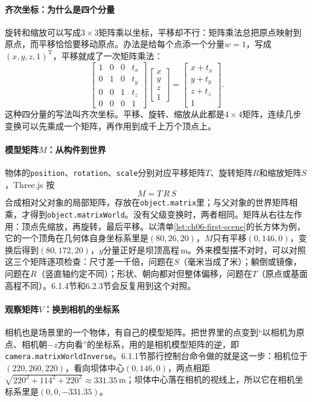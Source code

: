 \paragraph{齐次坐标：为什么是四个分量}旋转和缩放可以写成$3\times3$矩阵乘以坐标，平移却不行：矩阵乘法总把原点映射到原点，而平移恰恰要移动原点。办法是给每个点添一个分量$w=1$，写成$(x,y,z,1)^{\mathrm T}$，平移就成了一次矩阵乘法：
\[
\begin{bmatrix}1&0&0&t_x\\0&1&0&t_y\\0&0&1&t_z\\0&0&0&1\end{bmatrix}
\begin{bmatrix}x\\y\\z\\1\end{bmatrix}
=\begin{bmatrix}x+t_x\\y+t_y\\z+t_z\\1\end{bmatrix}.
\]
这种四分量的写法叫齐次坐标。平移、旋转、缩放从此都是$4\times4$矩阵，连续几步变换可以先乘成一个矩阵，再作用到成千上万个顶点上。

\paragraph{模型矩阵$M$：从构件到世界}物体的\texttt{position}、\texttt{rotation}、\texttt{scale}分别对应平移矩阵$T$、旋转矩阵$R$和缩放矩阵$S$，Three.js 按
\[
  M=T\,R\,S
\]
合成相对父对象的局部矩阵，存放在\texttt{object.matrix}里；与父对象的世界矩阵相乘，才得到\texttt{object.matrixWorld}。没有父级变换时，两者相同。矩阵从右往左作用：顶点先缩放，再旋转，最后平移。以清单\ref{lst:ch06-first-scene}的长方体为例，它的一个顶角在几何体自身坐标系里是$(80,26,20)$，$M$只有平移$(0,146,0)$，变换后得到$(80,172,20)$，$y$分量正好是坝顶高程\cpCrestElev\,m。外来模型摆不对时，可以对照这三个矩阵逐项检查：尺寸差一千倍，问题在$S$（毫米当成了米）；躺倒或镜像，问题在$R$（竖直轴约定不同）；形状、朝向都对但整体偏移，问题在$T$（原点或基面高程不同）。6.1.4节和6.2.3节会反复用到这个对照。

\paragraph{观察矩阵$V$：换到相机的坐标系}相机也是场景里的一个物体，有自己的模型矩阵。把世界里的点变到“以相机为原点、相机朝$-z$方向看”的坐标系，用的是相机模型矩阵的逆，即\texttt{camera.matrixWorldInverse}。6.1.1节那行控制台命令做的就是这一步：相机位于$(220,260,220)$，看向坝体中心$(0,146,0)$，两点相距$\sqrt{220^2+114^2+220^2}\approx331.35$\,m；坝体中心落在相机的视线上，所以它在相机坐标系里是$(0,0,-331.35)$。


